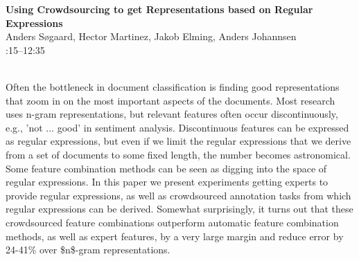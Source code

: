 \documentclass[twoside,makeidx]{book}
\renewcommand{\normalsize}{\fontsize{8}{9}\selectfont}
\renewcommand{\small}{\fontsize{7}{8}\selectfont}
\begin{document}
\par\vspace{2em}\noindent%
\begin{minipage}{\linewidth}%
\begin{center}
\textbf{\normalsize Using Crowdsourcing to get Representations based on Regular Expressions}\\
\normalsize  Anders S{\o}gaard,  Hector Martinez,  Jakob Elming,  Anders Johannsen\\
{\small 12:15--12:35}\\
\end{center}
\end{minipage}\\[0.5em]
\nopagebreak%
\noindent%
{\small Often the bottleneck in document classification is finding good representations that zoom in on the most important aspects of the documents. Most research uses n-gram representations, but relevant features often occur discontinuously, e.g., 'not ... good' in sentiment analysis. Discontinuous features can be expressed as regular expressions, but even if we limit the regular expressions that we derive from a set of documents to some fixed length, the number becomes astronomical. Some feature combination methods can be seen as digging into the space of regular expressions. In this paper we present experiments getting experts to provide regular expressions, as well as crowdsourced annotation tasks from which regular expressions can be derived. Somewhat surprisingly, it turns out that these crowdsourced feature combinations outperform automatic feature combination methods, as well as expert features, by a very large margin and reduce error by 24-41\% over \$n\$-gram representations.}
\clearpage
\end{document}
